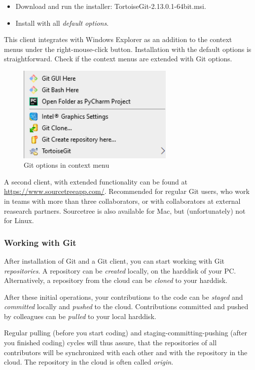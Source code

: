 \begin{itemize}
	\item Download and run the installer: \textsf{TortoiseGit-2.13.0.1-64bit.msi}.
	\item Install with all \emph{default options}.
\end{itemize}

This client integrates with Windows Explorer as an addition to the context menus under the right-mouse-click button.
Installation with the default options is straightforward. Check if the context menus are extended with Git options.

\begin{figure}[ht]
	\centering
	\includegraphics[width=3.0in]{Figures/context_menu.png}
	\caption{Git options in context menu}
	\label{fig:Tortoise_context}
\end{figure}

A second client, with extended functionality can be found at \url{https://www.sourcetreeapp.com/}. Recommended for regular Git users, who work in teams with more than three collaborators, or with collaborators at external reasearch partners. Sourcetree is also available for Mac, but (unfortunately) not for Linux.

\subsubsection{Working with Git}
\label{appendix::gitnotes}

After installation of Git and a Git client, you can start working with Git \emph{repositories}. A repository can be \emph{created} locally, on the harddisk of your PC. Alternatively, a repository from the cloud can be \emph{cloned} to your harddisk. 

After these initial operations, your contributions to the code can be \emph{staged} and \emph{committed} locally and \emph{pushed} to the cloud. Contributions committed and pushed by colleagues can be \emph{pulled} to your local harddisk. 

Regular pulling (before you start coding) and staging-committing-pushing (after you finished coding) cycles will thus assure, that the repositories of all contributors will be synchronized with each other and with the repository in the cloud. The repository in the cloud is often called \emph{origin}.

